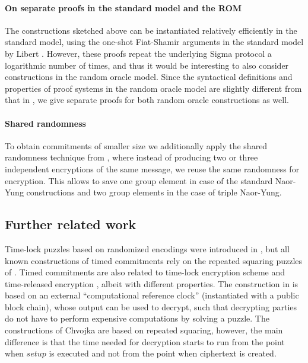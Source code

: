 \paragraph{On separate proofs in the standard model and the ROM}
The constructions sketched above can be instantiated relatively efficiently in the standard model, using the one-shot Fiat-Shamir arguments in the standard model by Libert \etal \cite{Libert2021OneShotFN}. However, these proofs repeat the underlying Sigma protocol a logarithmic number of times, and thus it would be interesting to also consider constructions in the random oracle model.
Since the syntactical definitions and properties of proof systems in the random oracle model are slightly different from that in \cite{Libert2021OneShotFN}, we give separate proofs for both random oracle constructions as well. 

\paragraph{Shared randomness} To obtain commitments of smaller size we additionally apply the shared randomness technique from \cite{SCN:BiaMasVen16}, where instead of producing two or three independent encryptions of the same message, we reuse the same randomness for encryption. This allows to save one group element in case of the standard Naor-Yung constructions and two group elements in the case of triple Naor-Yung.

\subsection{Further related work}
Time-lock puzzles based on randomized encodings were introduced in \cite{TCC:BDGM19}, but all known constructions of timed commitments rely on the repeated squaring puzzles of \cite{RSW96}.
Timed commitments are also related to time-lock encryption scheme \cite{liu2018build} and time-released encryption \cite{cryptoeprint:2020/739}, albeit with different properties. The construction in \cite{liu2018build} is based on an external ``computational reference clock'' (instantiated with a public block chain), whose output can be used to decrypt, such that decrypting parties do not have to perform expensive computations by solving a puzzle. The constructions of Chvojka \etal \cite{cryptoeprint:2020/739} are based on repeated squaring, however, the main difference is that the time needed for decryption starts to run from the point when $setup$ is executed and not from the point when ciphertext is created. 


